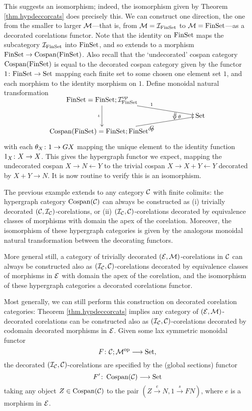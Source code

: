 \begin{example}
  This suggests an isomorphism; indeed, the isomorphism given by Theorem
  \ref{thm.hypdeccorcats} does precisely this. We can construct one direction,
  the one from the smaller to larger $\mathcal M$---that is, from $\mathcal M = \mathcal
  I_{\mathrm{FinSet}}$ to $\mathcal M = \mathrm{FinSet}$---as a decorated corelations
  functor.  Note that the identity on $\mathrm{FinSet}$ maps the subcategory $\mathcal
  I_{\mathrm{FinSet}}$ into $\mathrm{FinSet}$, and so extends to a morphism $\mathrm{FinSet} \to
  \operatorname{{Cospan}}(\mathrm{FinSet})$. Also recall that the `undecorated' cospan category
  $\operatorname{{Cospan}}(\mathrm{FinSet})$ is equal to the decorated cospan category given by the
  functor $1{\colon} \mathrm{FinSet} \to \mathrm{Set}$ mapping each finite set to some chosen one
  element set $1$, and each morphism to the identity morphism on $1$. Define
  monoidal natural transformation 
  \[
    \xymatrixrowsep{2ex}
    \xymatrix{
      \FinSet = \FinSet; \mc I_{\FinSet}^\opp \ar[dd]_{\iota} \ar[drr]^1  \\
      &\twocell \omit{_\:\theta}& \Set \\
      \cospan(\FinSet) = \FinSet; \FinSet^\opp \ar[urr]_{G} 
    }
  \]
  with each $\theta_X {\colon} 1 \to GX$ mapping the unique element to the identity
  function $1_X{\colon} X \to X$.  This gives the hypergraph functor we expect,
  mapping the undecorated cospan $X \to N \leftarrow Y$ to the trivial cospan $X
  \to X+Y \leftarrow Y$ decorated by $X+Y \to N$. It is now routine to verify
  this is an isomorphism.
\end{example}

The previous example extends to any category $\mathcal C$ with finite colimits: the
hypergraph category $\operatorname{{Cospan}}(\mathcal C)$ can always be constructed as (i)
trivially decorated $(\mathcal C, \mathcal I_{\mathcal C})$-corelations, or (ii) $(\mathcal I_{\mathcal
C}, \mathcal C)$-corelations decorated by equivalence classes of morphisms with
domain the apex of the corelation. Moreover, the isomorphism of these
hypergraph categories is given by the analogous monoidal natural transformation
between the decorating functors.

More general still, a category of trivially decorated $(\mathcal E, \mathcal
M)$-corelations in $\mathcal C$ can always be constructed also as $(\mathcal I_{\mathcal C},
\mathcal C)$-corelations decorated by equivalence classes of morphisms in $\mathcal E$
with domain the apex of the corelation, and the isomorphism of these
hypergraph categories a decorated corelations functor.

Most generally, we can still perform this construction on decorated corelation
categories: Theorem \ref{thm.hypdeccorcats} implies any category of $(\mathcal E,\mathcal
M)$-decorated corelations can be constructed also as $(\mathcal I_{\mathcal C}, \mathcal
C)$-corelations decorated by codomain decorated morphisms in $\mathcal E$. Given some
lax symmetric monoidal functor
\[
  F{\colon} \mathcal C;\mathcal M^{\mathrm{op}} \longrightarrow \mathrm{Set},
\]
the decorated $(\mathcal I_{\mathcal C}, \mathcal C)$-corelations are specified by the (global
sections) functor
\[
  F'{\colon} \operatorname{{Cospan}}(\mathcal C) \longrightarrow \mathrm{Set}
\]
taking any object $Z \in \operatorname{{Cospan}}(\mathcal C)$ to the pair $(Z \stackrel{e}\to N,
1\stackrel{s}\to FN)$, where $e$ is a morphism in $\mathcal E$.

